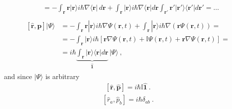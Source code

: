 \documentclass[letterpaper,10pt,english]{jupyterBook}
\begin{document}
\begin{equation*}
\begin{split}
\begin{aligned}
 & = - \int_{\mathbf{r}} \mathbf{r} | \mathbf{r} \rangle i \hbar \nabla \langle \mathbf{r} | \, d \mathbf{r} + \int_{\mathbf{r}} | \mathbf{r} \rangle i \hbar \nabla \langle \mathbf{r} | d \mathbf{r} \int_{\mathbf{r}'} \mathbf{r}' | \mathbf{r}' \rangle \langle \mathbf{r}' | d \mathbf{r}' = \dots
\end{aligned}\end{split}
\end{equation*}\begin{equation*}
\begin{split}\begin{aligned}
\left[ \hat{\mathbf{r}}, \hat{\mathbf{p}} \right] | \Psi \rangle 
 & = - \int_{\mathbf{r}} \mathbf{r} | \mathbf{r} \rangle i \hbar \nabla \Psi(\mathbf{r},t) + \int_{\mathbf{r}} | \mathbf{r} \rangle i \hbar \nabla \left( \mathbf{r} \Psi(\mathbf{r},t) \right) = \\
 & = - \int_{\mathbf{r}} | \mathbf{r} \rangle i \hbar \left[ \mathbf{r} \nabla \Psi(\mathbf{r},t) + \mathbb{I} \Psi(\mathbf{r},t) + \mathbf{r} \nabla \Psi(\mathbf{r},t) \right] = \\
 & = i \hbar \underbrace{\int_{\mathbf{r}} | \mathbf{r} \rangle \langle \mathbf{r} | d \mathbf{r}}_{\hat{\mathbf{1}}} \, | \Psi \rangle \ ,
\end{aligned}\end{split}
\end{equation*}
\sphinxAtStartPar
and since \(| \Psi \rangle\) is arbitrary
\begin{equation*}
\begin{split}\left[ \hat{\mathbf{r}}, \hat{\mathbf{p}} \right] = i \hbar \mathbb{I} \hat{\mathbf{1}} \ . \end{split}
\end{equation*}\begin{equation*}
\begin{split}\left[ \hat{r}_a, \hat{p}_b \right] = i \hbar \delta_{ab} \ . \end{split}
\end{equation*}
\end{document}
